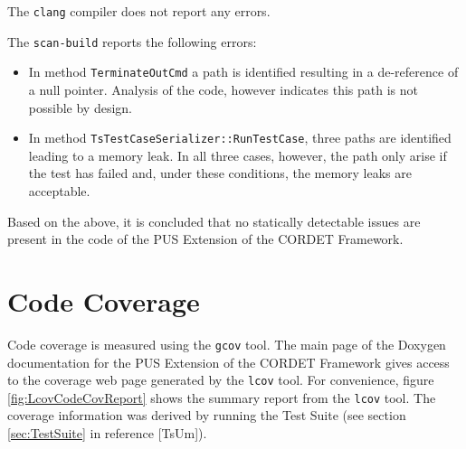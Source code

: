 \documentclass{pnp_article}
\begin{document}
The \texttt{clang} compiler does not report any errors.

The \texttt{scan-build} reports the following errors:

\begin{itemize}
\item In method \texttt{TerminateOutCmd} a path is identified resulting in a de-reference of a null pointer. Analysis of the code, however indicates this path is not possible by design.
\item In method \texttt{TsTestCaseSerializer::RunTestCase}, three paths are identified leading to a memory leak. In all three cases, however, the path only arise if the test has failed and, under these conditions, the memory leaks are acceptable.
\end{itemize}

Based on the above, it is concluded that no statically detectable issues are present in the code of the PUS Extension of the CORDET Framework.







\section{Code Coverage}\label{sec:svrCodeCov}
Code coverage is measured using the \texttt{gcov} tool. The main page of the Doxygen documentation for the PUS Extension of the CORDET Framework gives access to the coverage web page generated by the \texttt{lcov} tool. For convenience, figure \ref{fig:LcovCodeCovReport} shows the summary report from the \texttt{lcov} tool. The coverage information was derived by running the Test Suite (see section \ref{sec:TestSuite} in reference [TsUm]).
\end{document}
